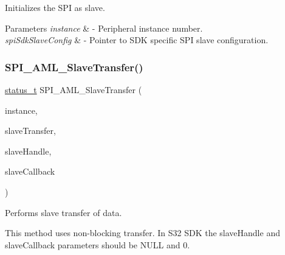 Initializes the S\+PI as slave. 


\begin{DoxyParams}{Parameters}
{\em instance} & -\/ Peripheral instance number. \\
\hline
{\em spi\+Sdk\+Slave\+Config} & -\/ Pointer to S\+DK specific S\+PI slave configuration. \\
\hline
\end{DoxyParams}
\mbox{\label{group__function__group_gaabf878120f5f9da678aeb8885bb5af20}} 
\subsubsection{\texorpdfstring{SPI\_AML\_SlaveTransfer()}{SPI\_AML\_SlaveTransfer()}}
{\footnotesize\ttfamily \mbox{\hyperlink{group__ksdk__common_gaaabdaf7ee58ca7269bd4bf24efcde092}{status\+\_\+t}} S\+P\+I\+\_\+\+A\+M\+L\+\_\+\+Slave\+Transfer (\begin{DoxyParamCaption}\item[{\mbox{\hyperlink{common__aml_8h_a562bd37c7d07adcedec5993bc0cd96e5}{aml\+\_\+instance\+\_\+t}}}]{instance,  }\item[{\mbox{\hyperlink{structspi__aml__transfer__t}{spi\+\_\+aml\+\_\+transfer\+\_\+t}} $\ast$}]{slave\+Transfer,  }\item[{\mbox{\hyperlink{group__spi__driver_gad267cfee3a876b2860217ff94f03f574}{spi\+\_\+slave\+\_\+handle\+\_\+t}} $\ast$}]{slave\+Handle,  }\item[{\mbox{\hyperlink{group__spi__driver_ga13fbc3110c56c1d312e4a5ebed07d679}{spi\+\_\+slave\+\_\+callback\+\_\+t}}}]{slave\+Callback }\end{DoxyParamCaption})}



Performs slave transfer of data. 

This method uses non-\/blocking transfer. In S32 S\+DK the slave\+Handle and slave\+Callback parameters should be N\+U\+LL and 0.


